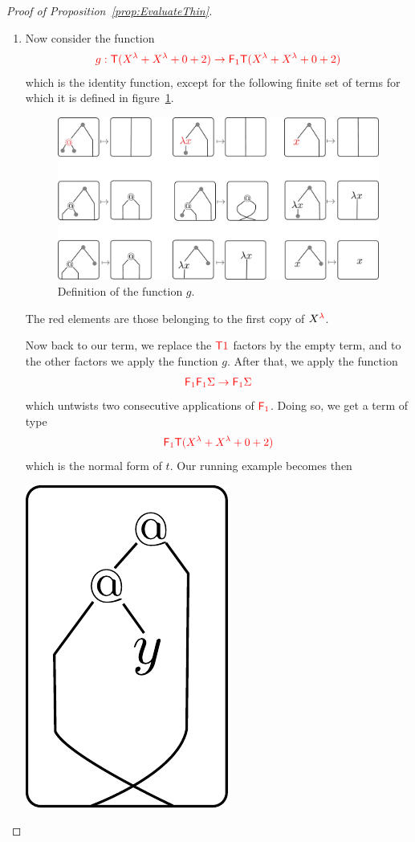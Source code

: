 \begin{proof}[Proof of Proposition~\ref{prop:EvaluateThin}]
\begin{enumerate}
\item Now consider the function 
 \begin{align*}
 {\color{red}{g: {\color{red}{\mathsf T}}(X^\lambda+X^\lambda+0+2) \to {\color{red}{\mathsf F_{1}}}{\color{red}{\mathsf T}}(X^\lambda+X^\lambda+0+2)}}
 \end{align*}
 which is the identity function, except for the following finite set of terms for which it is defined in figure~\ref{fig:definition-g}.
\begin{figure}
\begin{center}
\includegraphics[scale=.4]{pictures/function-g}
\end{center}
\caption{Definition of the function $g$.} \label{fig:definition-g}
\end{figure}
The red elements are those belonging to the first copy of ${X}^{{\color{red}{\lambda}}}$.
\smallskip

Now back to our term, we replace the  ${\color{red}{{\color{red}{\mathsf T}}1}}$ factors by the empty term, and to the other factors we apply the function $g$. After that, we apply the function 
\begin{align*}
{\color{red}{{\color{red}{\mathsf F_{1}}}{\color{red}{\mathsf F_{1}}}\Sigma \to {\color{red}{\mathsf F_{1}}}\Sigma}}
\end{align*}
which untwists two consecutive applications of $\reduce 1$. Doing so, we get a term of type  $${\color{red}{{\color{red}{\mathsf F_{1}}}{\color{red}{\mathsf T}}(X^\lambda+X^\lambda+0+2)}}$$ which is  the normal form of $t$. Our running example becomes then
\begin{center}
\includegraphics[scale=.4]{pictures/running-thin-5}
\end{center}


\end{enumerate}
\end{proof}
